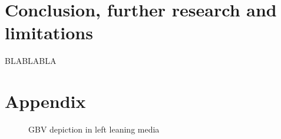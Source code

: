 \documentclass{article}
\begin{document}
{{}
	
}
\newpage
\section{Conclusion, further research and limitations}{
BLABLABLA
}


\section{Appendix}{

\begin{figure}[H]
	\caption{\label{fig:my-label1} GBV depiction in left leaning media}
\end{figure}


}
\end{document}
